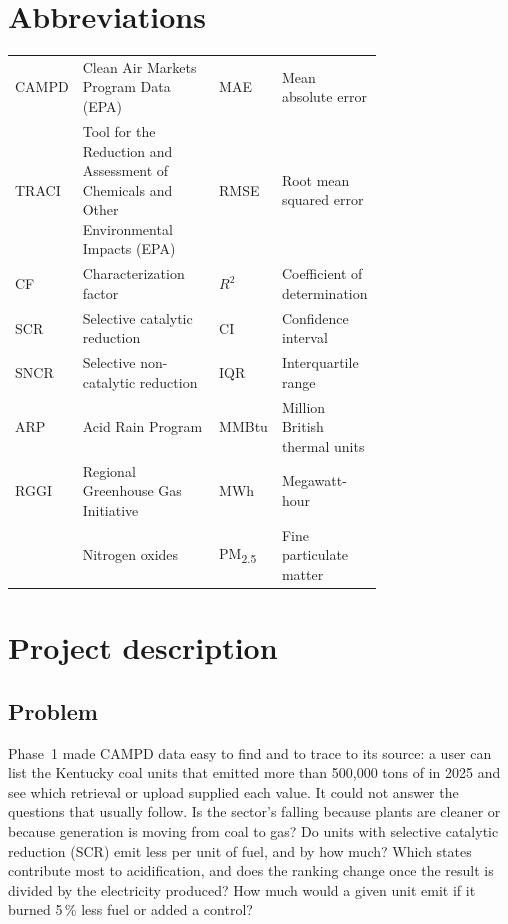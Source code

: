 \documentclass[11pt,a4paper]{article}
\newcommand{\PMtwofive}{PM\textsubscript{2.5}}
\begin{document}
\tableofcontents

\section*{Abbreviations}
{\small
\begin{tabular}{@{}l p{0.45\linewidth} l p{0.28\linewidth}@{}}
CAMPD & Clean Air Markets Program Data (EPA) & MAE & Mean absolute error\\
TRACI & Tool for the Reduction and Assessment of Chemicals and Other Environmental Impacts (EPA) & RMSE & Root mean squared error\\
CF & Characterization factor & $R^2$ & Coefficient of determination\\
SCR & Selective catalytic reduction & CI & Confidence interval\\
SNCR & Selective non-catalytic reduction & IQR & Interquartile range\\
ARP & Acid Rain Program & MMBtu & Million British thermal units\\
RGGI & Regional Greenhouse Gas Initiative & MWh & Megawatt-hour\\
\NOx{} & Nitrogen oxides & \PMtwofive{} & Fine particulate matter\\
\end{tabular}}
\newpage

\section{Project description}
\label{sec:description}

\subsection{Problem}

Phase~1 made CAMPD data easy to find and to trace to its source: a user can list the Kentucky
coal units that emitted more than 500{,}000 tons of \COtwo{} in 2025 and see which retrieval or
upload supplied each value. It could not answer the questions that usually follow. Is the
sector's \COtwo{} falling because plants are cleaner or because generation is moving from coal
to gas? Do units with selective catalytic reduction (SCR) emit less \NOx{} per unit of fuel, and
by how much? Which states contribute most to acidification, and does the ranking change once
the result is divided by the electricity produced? How much \NOx{} would a given unit emit if it
burned 5\,\% less fuel or added a control?
\end{document}

